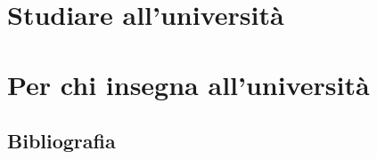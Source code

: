 \documentclass[stampa,monocromo]{studiolibro}
\begin{document}
\part{Studiare all'università}





\part{Per chi insegna all'università}







\appendix




\backmatter
\chapter{Bibliografia}
\printbibliography[heading=none]

\finis
\end{document}
